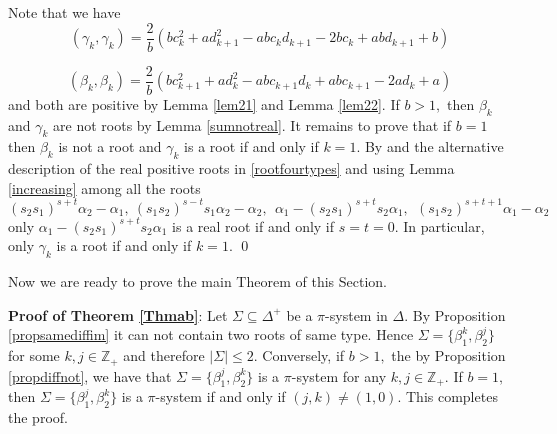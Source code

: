 \documentclass[12pt,reqno]{amsart}
\theoremstyle{plain}
\theoremstyle{definition}
\theoremstyle{remark}
\newcommand\bz{\mathbb Z}
\begin{document}
Note that we have 
$$(\gamma_k,\gamma_k)=\frac{2}{b}(bc_k^2+ad_{k+1}^2-abc_kd_{k+1}-2bc_k+abd_{k+1}+b)$$

$$(\beta_k,\beta_k)=\frac{2}{b}(bc_{k+1}^2+ad_{k}^2-abc_{k+1}d_{k}+abc_{k+1}-2ad_{k}+a)$$
and both are positive by Lemma \ref{lem21} and Lemma \ref{lem22}. If $b>1,$ then $\beta_k$ and $\gamma_k$ are not roots by Lemma \ref{sumnotreal}. It remains to prove that if $b=1$ then $\beta_k$ is not a root and $\gamma_k$ is a root if and only if $k=1.$ By \cite[Theorem 3.6]{carbone2021commutator} and the alternative description of the real positive roots in \ref{rootfourtypes} and using Lemma \ref{increasing} among all the roots 
$$(s_2s_1)^{s+t}\alpha_2-\alpha_1,\ (s_1s_2)^{s-t}s_1\alpha_2-\alpha_2,\ \ \alpha_1-(s_2s_1)^{s+t}s_2\alpha_1,\ \ (s_1s_2)^{s+t+1}\alpha_1-\alpha_2$$  only $\alpha_1-(s_2s_1)^{s+t}s_2\alpha_1$ is a real root if and only if $s=t=0.$  In particular, only $\gamma_k$ is a root if and only if $k=1.$ \qed



\medskip


\noindent Now we are ready to prove the main Theorem of this Section.
\medskip

\noindent \textbf{Proof of Theorem \ref{Thmab}}: Let $\Sigma\subseteq \Delta^+$ be a $\pi$-system in $\Delta.$ By Proposition \ref{propsamediffim} it can not contain two roots of same type. Hence $\Sigma=\{\beta_1^k,\beta_2^j\}$ for some $k,j\in\bz_+$ and therefore $|\Sigma|\le 2.$ Conversely, if $b>1,$ the by Proposition \ref{propdiffnot}, we have that $\Sigma=\{\beta_1^j,\beta_2^k\}$ is a $\pi$-system for any $k,j\in\bz_+.$ If $b=1,$ then $\Sigma=\{\beta_1^j,\beta_2^k\}$ is a $\pi$-system if and only if $(j,k)\neq (1,0).$ This completes the proof.\vspace{20pt}
\end{document}
